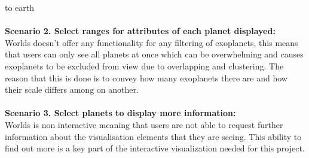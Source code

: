 to earth 
\\\\
{\bf Scenario 2. Select ranges for attributes of each planet displayed:\\}
Worlds doesn't offer any functionality for any filtering of exoplanets, this
means that users can only see all planets at once which can be overwhelming and
causes exoplanets to be excluded from view due to overlapping
and clustering. The reason that this is done is to convey how many exoplanets
there are and how their scale differs among on another.
\\\\
{\bf Scenario 3. Select planets to display more information:\\}
Worlds is non interactive meaning that users are not able to request further
information about the visualisation elements that they are seeing. This ability
to find out more is a key part of the interactive visualization needed
for this project.

